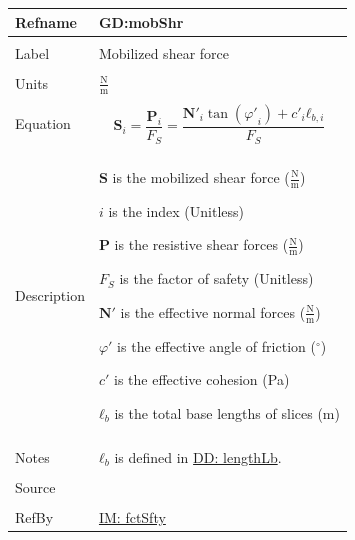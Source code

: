 \documentclass[12pt]{article}
\begin{document}
\vspace{\baselineskip}
\noindent
\begin{minipage}{\textwidth}
\begin{tabular}{>{\raggedright}p{}>{\raggedright\arraybackslash}p{}}
\toprule \textbf{Refname} & \textbf{GD:mobShr}
\label{GD:mobShr}
\\ \midrule \\
Label & Mobilized shear force
        
\\ \midrule \\
Units & $\frac{\text{N}}{\text{m}}$
        
\\ \midrule \\
Equation & \begin{displaymath}
           {\mathbf{S}}_{i}=\frac{{\mathbf{P}}_{i}}{{F_{S}}}=\frac{{\mathbf{N'}}_{i} \tan\left({φ'}_{i}\right)+{c'}_{i} {\mathbf{ℓ}_{b,i}}}{{F_{S}}}
           \end{displaymath}
\\ \midrule \\
Description & \begin{symbDescription}
              \item{$\mathbf{S}$ is the mobilized shear force ($\frac{\text{N}}{\text{m}}$)}
              \item{$i$ is the index (Unitless)}
              \item{$\mathbf{P}$ is the resistive shear forces ($\frac{\text{N}}{\text{m}}$)}
              \item{${F_{S}}$ is the factor of safety (Unitless)}
              \item{$\mathbf{N'}$ is the effective normal forces ($\frac{\text{N}}{\text{m}}$)}
              \item{$φ'$ is the effective angle of friction (${}^{\circ}$)}
              \item{$c'$ is the effective cohesion (Pa)}
              \item{${\mathbf{ℓ}_{b}}$ is the total base lengths of slices (m)}
              \end{symbDescription}
\\ \midrule \\
Notes & ${\mathbf{ℓ}_{b}}$ is defined in \hyperref[DD:lengthLb]{DD: lengthLb}.
        
\\ \midrule \\
Source & \cite{chen2005}
         
\\ \midrule \\
RefBy & \hyperref[IM:fctSfty]{IM: fctSfty}
        
\\ \bottomrule
\end{tabular}
\end{minipage}
\end{document}
